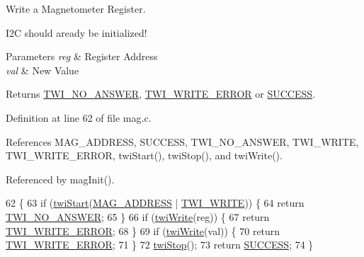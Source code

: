 Write a Magnetometer Register. 

I2\-C should aready be initialized!


\begin{DoxyParams}{Parameters}
{\em reg} & Register Address \\
\hline
{\em val} & New Value \\
\hline
\end{DoxyParams}
\begin{DoxyReturn}{Returns}
\hyperlink{group__error_gga2c3e4bb40f36b262a5214e2da2bca9c5a04d5943ba652af2205c88b247e0c659c}{T\-W\-I\-\_\-\-N\-O\-\_\-\-A\-N\-S\-W\-E\-R}, \hyperlink{group__error_gga2c3e4bb40f36b262a5214e2da2bca9c5ac0e3b3463dcaf220e54794b4711708c9}{T\-W\-I\-\_\-\-W\-R\-I\-T\-E\-\_\-\-E\-R\-R\-O\-R} or \hyperlink{group__error_gga2c3e4bb40f36b262a5214e2da2bca9c5ac7f69f7c9e5aea9b8f54cf02870e2bf8}{S\-U\-C\-C\-E\-S\-S}. 
\end{DoxyReturn}


Definition at line 62 of file mag.\-c.



References M\-A\-G\-\_\-\-A\-D\-D\-R\-E\-S\-S, S\-U\-C\-C\-E\-S\-S, T\-W\-I\-\_\-\-N\-O\-\_\-\-A\-N\-S\-W\-E\-R, T\-W\-I\-\_\-\-W\-R\-I\-T\-E, T\-W\-I\-\_\-\-W\-R\-I\-T\-E\-\_\-\-E\-R\-R\-O\-R, twi\-Start(), twi\-Stop(), and twi\-Write().



Referenced by mag\-Init().


\begin{DoxyCode}
62                                                  \{
63     \textcolor{keywordflow}{if} (\hyperlink{group__twi_ga4f86edc73f37ce976ea2225519ab31cd}{twiStart}(\hyperlink{group__mag_gade4e63fac819c67040e374f08d2d7230}{MAG\_ADDRESS} | \hyperlink{group__twi_ga3b68e8e777b71520f9dbfac733774d5f}{TWI\_WRITE})) \{
64         \textcolor{keywordflow}{return} \hyperlink{group__error_gga2c3e4bb40f36b262a5214e2da2bca9c5a04d5943ba652af2205c88b247e0c659c}{TWI\_NO\_ANSWER};
65     \}
66     \textcolor{keywordflow}{if} (\hyperlink{group__twi_gaf42e50aaf4a9794d3a2c000e7b407887}{twiWrite}(reg)) \{
67         \textcolor{keywordflow}{return} \hyperlink{group__error_gga2c3e4bb40f36b262a5214e2da2bca9c5ac0e3b3463dcaf220e54794b4711708c9}{TWI\_WRITE\_ERROR};
68     \}
69     \textcolor{keywordflow}{if} (\hyperlink{group__twi_gaf42e50aaf4a9794d3a2c000e7b407887}{twiWrite}(val)) \{
70         \textcolor{keywordflow}{return} \hyperlink{group__error_gga2c3e4bb40f36b262a5214e2da2bca9c5ac0e3b3463dcaf220e54794b4711708c9}{TWI\_WRITE\_ERROR};
71     \}
72     \hyperlink{group__twi_gabf581270e9537a60e2d8cf3d2c1543d1}{twiStop}();
73     \textcolor{keywordflow}{return} \hyperlink{group__error_gga2c3e4bb40f36b262a5214e2da2bca9c5ac7f69f7c9e5aea9b8f54cf02870e2bf8}{SUCCESS};
74 \}
\end{DoxyCode}


